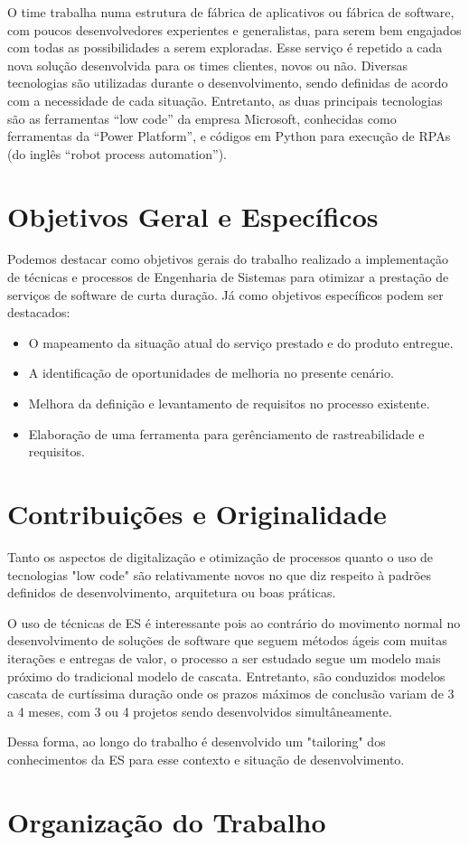 	O time trabalha numa estrutura de fábrica de aplicativos ou fábrica de software, 
	com poucos desenvolvedores experientes e generalistas, para serem bem 
	engajados com todas as possibilidades a serem exploradas. Esse serviço é repetido 
	a cada nova solução desenvolvida para os times clientes, novos ou não. 
	Diversas tecnologias são utilizadas durante o desenvolvimento, sendo definidas de 
	acordo com a necessidade de cada situação. Entretanto, as duas principais 
	tecnologias são as ferramentas “low code” da empresa Microsoft, conhecidas como 
	ferramentas da “Power Platform”, e códigos em Python para execução de RPAs (do 
	inglês “robot process automation”). 

	\section{Objetivos Geral e Específicos}\label{sec:introducao:objetivos}

		Podemos destacar como objetivos gerais do trabalho realizado a implementação de 
		técnicas e processos de Engenharia de Sistemas para otimizar a prestação de 
		serviços de software de curta duração. 
		Já como objetivos específicos podem ser destacados: 
		\begin{itemize}
			\item O mapeamento da situação atual do serviço prestado e do produto entregue.
			\item A identificação de oportunidades de melhoria no presente cenário. 
			\item Melhora da definição e levantamento de requisitos no processo existente.
			\item Elaboração de uma ferramenta para gerênciamento de rastreabilidade e requisitos.
		\end{itemize}
 		
 		

	\section{Contribuições e Originalidade}\label{sec:introducao:contribuicoes}


		Tanto os aspectos de digitalização e otimização de processos quanto o uso de tecnologias "low code" são relativamente novos no que diz respeito à padrões definidos
		de desenvolvimento, arquitetura ou boas práticas.

		O uso de técnicas de ES é interessante pois ao contrário do movimento normal no desenvolvimento de soluções de software que seguem métodos ágeis com muitas iterações e entregas
		de valor, o processo a ser estudado segue um modelo mais próximo do tradicional modelo de cascata. Entretanto, são conduzidos modelos cascata de curtíssima duração onde os prazos
		máximos de conclusão variam de 3 a 4 meses, com 3 ou 4 projetos sendo desenvolvidos simultâneamente.

		Dessa forma, ao longo do trabalho é desenvolvido um "tailoring" dos conhecimentos da ES para esse contexto e situação de desenvolvimento.
	
	\section{Organização do Trabalho}\label{sec:introducao:organizacao}

		
